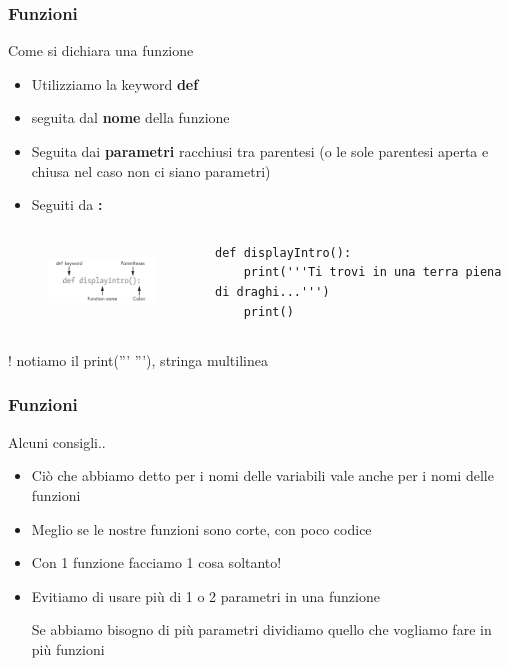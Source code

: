 \begin{frame}[fragile]
\frametitle{Funzioni}
        \begin{block}{Come si dichiara una funzione}
            \begin{itemize}
                \item Utilizziamo la keyword \textbf{def}
                \item seguita dal \textbf{nome} della funzione
                \item Seguita dai \textbf{parametri} racchiusi tra parentesi (o le sole parentesi aperta e chiusa nel caso non ci siano parametri)
                \item Seguiti da \textbf{:}
            \end{itemize}
        \end{block}

        \begin{columns}
	    \begin{column}{4cm}
			\begin{figure}
   				\includegraphics[height=2cm]{images/function_signature_example.png}
			\end{figure}
		\end{column}

		\begin{column}{6cm}
            \begin{lstlisting}
def displayIntro():
    print('''Ti trovi in una terra piena di draghi...''')
    print()
            \end{lstlisting}
		\end{column}
	\end{columns}
	! notiamo il print(''' '''), stringa multilinea
\end{frame}

\begin{frame}
\frametitle{Funzioni}
    \begin{block}{Alcuni consigli..}
        \begin{itemize}
            \item Ciò che abbiamo detto per i nomi delle variabili vale anche per i nomi delle funzioni
            \item Meglio se le nostre funzioni sono corte, con poco codice
            \item  Con 1 funzione facciamo 1 cosa soltanto!
            \item Evitiamo di usare più di 1 o 2 parametri in una funzione

            Se abbiamo bisogno di più parametri dividiamo quello che vogliamo fare in più funzioni
        \end{itemize}
    \end{block}
\end{frame}

